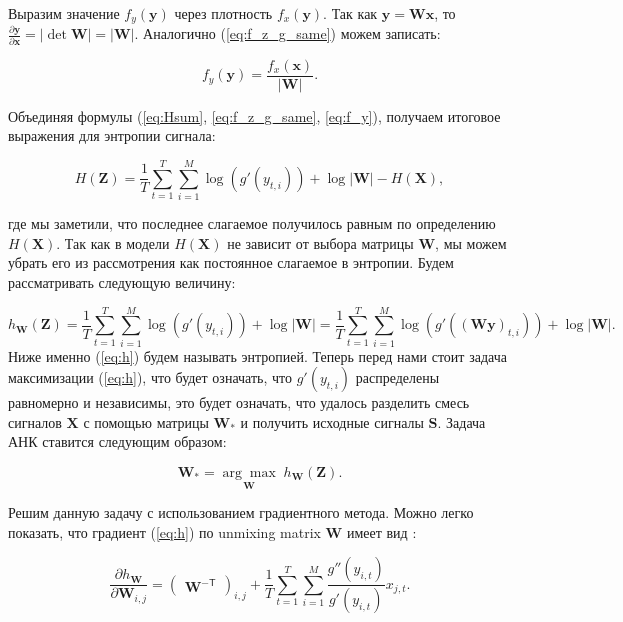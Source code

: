 \documentclass[a4paper,12pt]{article}
\begin{document}
	Выразим значение $f_y(\mathbf{y})$ через плотность $f_x(\mathbf{y})$. Так как $\mathbf{y} = \mathbf{W} \mathbf{x}$, то $\frac{\partial \mathbf{y}}{\partial \mathbf{x}} = |\det{\mathbf{W}}| = |\mathbf{W}|$. Аналогично (\ref{eq:f_z_g_same}) можем записать:
	
	\begin{equation} \label{eq:f_y}
	f_y(\mathbf{y}) = \frac{f_x(\mathbf{x})}{|\mathbf{W}|}.
	\end{equation}	
	
	Объединяя формулы (\ref{eq:Hsum}, \ref{eq:f_z_g_same}, \ref{eq:f_y}), получаем итоговое выражения для энтропии сигнала:
	
	\begin{equation}
		H(\mathbf{Z}) = \frac{1}{T} \sum\limits_{t=1}^{T} \sum\limits_{i=1}^{M} \log(g'(y_{t,i})) + \log{|\mathbf{W}|} - H(\mathbf{X}),
	\end{equation}
	
	где мы заметили, что последнее слагаемое получилось равным по определению $H(\mathbf{X})$. Так как в модели $H(\mathbf{X})$ не зависит от выбора матрицы $\mathbf{W}$, мы можем убрать его из рассмотрения как постоянное слагаемое в энтропии. Будем рассматривать следующую величину:
	
	\begin{equation} \label{eq:h}
		h_{\mathbf{W}}(\mathbf{Z}) = 
		\frac{1}{T} \sum\limits_{t=1}^{T} \sum\limits_{i=1}^{M} \log(g'(y_{t,i})) + \log{|\mathbf{W}|} = 
		\frac{1}{T} \sum\limits_{t=1}^{T} \sum\limits_{i=1}^{M} \log(g'((\mathbf{W} \mathbf{y})_{t,i})) + \log{|\mathbf{W}|}.
	\end{equation}
	Ниже именно (\ref{eq:h}) будем называть энтропией. Теперь перед нами стоит задача максимизации (\ref{eq:h}), что будет означать, что $g'(y_{t,i})$ распределены равномерно и независимы, это будет означать, что удалось разделить смесь сигналов $\mathbf{X}$ с помощью матрицы $\mathbf{W}_\ast$ и получить исходные сигналы $\mathbf{S}$. Задача АНК ставится следующим образом:
	
	\begin{equation} \label{eq:argmax}
		\mathbf{W}_\ast = \underset{\mathbf{W}}{\arg\max}\; h_{\mathbf{W}}(\mathbf{Z}).
	\end{equation}
	
	Решим данную задачу с использованием градиентного метода. Можно легко показать, что градиент (\ref{eq:h}) по unmixing matrix $\mathbf{W}$ имеет вид \cite{stone2004ica}:
	
	\begin{equation} \label{eq:grad_h_full}
		\frac{\partial h_{\mathbf{W}}}{\partial \mathbf{W}_{i,j}} = 
		\begin{pmatrix}\mathbf{W}^{-\mathsf{T}}\end{pmatrix}_{i,j} + 
		\frac{1}{T} \sum\limits_{t=1}^{T} \sum\limits_{i=1}^{M} \frac{g''(y_{i,t})}{g'(y_{i,t})} x_{j,t}.
	\end{equation}
	
\end{document}
